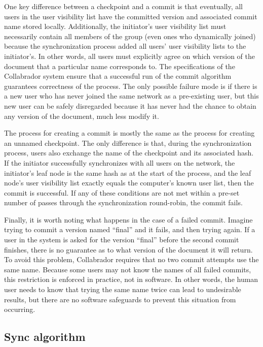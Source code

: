 \documentclass[11pt,titlepage]{article}
\begin{document}
One key difference between a checkpoint and a commit is that eventually, 
all users in the user visibility list have the
committed version and associated commit name stored
locally. Additionally, the initiator's user visibility list must
necessarily contain all members of the group (even ones who
dynamically joined) because the synchronization process added all
users' user visibility lists to the initiator's. In other words,
all users must explicitly agree on which version of the document that
a particular name corresponds to. 
The specifications of the Collabrador system ensure that a successful
run of the commit algorithm guarantees correctness of the
process. The only possible failure mode is if there is a new user
 who has never joined the same network as a pre-existing user, 
but this new user can be safely disregarded because it has never 
had the chance to obtain any version of the document, much less modify it.

The process for creating a commit is mostly the same as the process
for creating an unnamed checkpoint. The only difference is that,
during the synchronization process, users also exchange the name of
the checkpoint and its associated hash. If the initiator successfully
synchronizes with all users on the network, the initiator's leaf node
is the same hash as at the start of the process, and the leaf node's
user visibility list exactly equals the computer's known user list,
then the commit is successful. If any of these conditions are not met
within a pre-set number of passes through the synchronization
round-robin, the commit fails.


Finally, it is worth noting what happens in the case of a failed
commit. Imagine trying to commit a version named ``final'' and it
fails, and then trying again. If a user in the system is asked for the
version ``final'' before the second commit finishes, there is no
guarantee as to what version of the document it will return. To avoid
this problem, Collabrador requires that no two commit attempts use the
same name. Because some users may not know the names of all failed
commits, this restriction is enforced in practice, not in software. In
other words, the human user needs to know that trying the same name
twice can lead to undesirable results, but there are no software
safeguards to prevent this situation from occurring.

\subsection{Sync algorithm}
\end{document}
